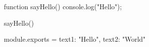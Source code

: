 function sayHello(){
    console.log("Hello");
}

sayHello()

module.exports = {
    text1: "Hello",
    text2: "World"
}